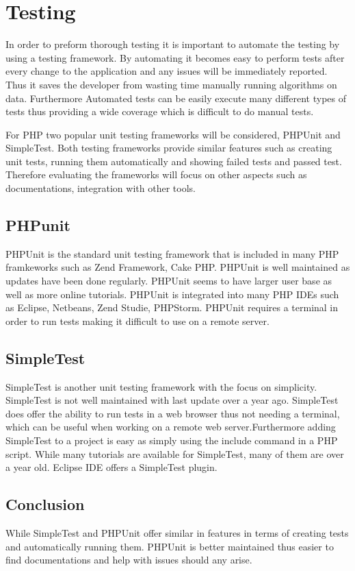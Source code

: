 \documentclass[a4paper,oneside,11pt]{report}
\begin{document}
\section{Testing}
In order to preform thorough testing it is important to automate the testing by using a testing framework. By automating it becomes easy to perform tests after every change to the application and any issues will be immediately reported. Thus it saves the developer from wasting time manually running algorithms on data. Furthermore Automated tests can be easily execute many different types of tests thus providing a wide coverage which is difficult to do manual tests.

For PHP two popular unit testing frameworks will be considered, PHPUnit and SimpleTest. Both testing frameworks provide similar features such as creating unit tests, running them automatically and showing failed tests and passed test. Therefore evaluating the frameworks will focus on other aspects such as documentations, integration with other tools.
\subsection{PHPunit}
PHPUnit is the standard unit testing framework that is included in many PHP framkeworks such as Zend Framework, Cake PHP. PHPUnit is well maintained as updates have been done regularly. PHPUnit seems to have larger user base as well as more online tutorials. PHPUnit is integrated into many PHP IDEs  such as Eclipse, Netbeans, Zend Studie, PHPStorm. PHPUnit requires a terminal in order to run tests making it difficult to use on a remote server.
\subsection{SimpleTest}
SimpleTest is another unit testing framework with the focus on simplicity. SimpleTest is not well maintained with last update over a year ago. SimpleTest does offer the ability to run tests in a web browser thus not needing a terminal, which can be useful when working on a remote web server.Furthermore adding SimpleTest to a project is easy as simply using the include command in a PHP script. While many tutorials are available for SimpleTest, many of them are over a year old. Eclipse IDE offers a SimpleTest plugin.

\subsection{Conclusion}
While SimpleTest and PHPUnit offer similar in features in terms of creating tests and automatically running them. PHPUnit is better maintained thus easier to find documentations and help with issues should any arise. 
\end{document}
